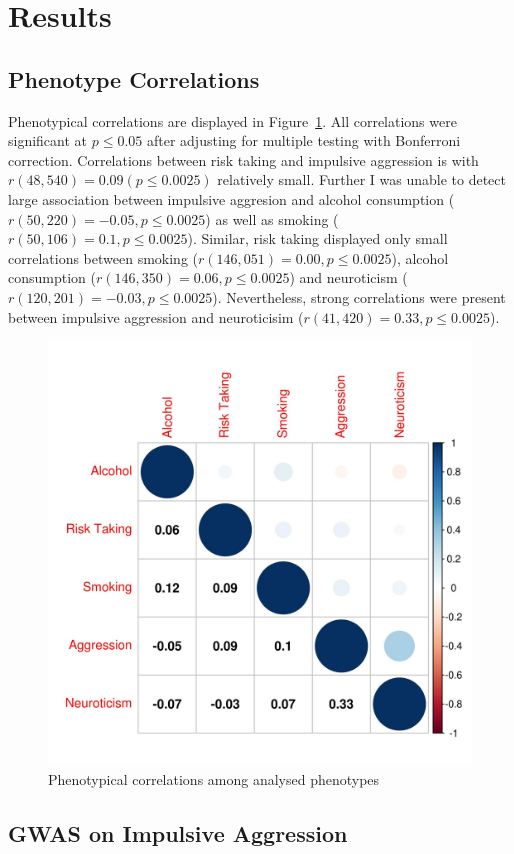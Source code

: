 \section{Results}
\label{sec:results_ukb_assoc}

\subsection{Phenotype Correlations}
\label{sub:phenotype_correlations}

Phenotypical correlations are displayed in Figure~\ref{fig:corr_pheno}. 
All correlations were significant at $p\leq 0.05$ after adjusting for multiple testing with Bonferroni correction.
Correlations between risk taking and impulsive aggression is with $r(48,540)=0.09 (p\leq0.0025)$ relatively small.
Further I was unable to detect large association between impulsive aggresion and
alcohol consumption ($r(50,220)=-0.05, p\leq0.0025$)
as well as smoking ($r(50,106)=0.1, p\leq0.0025$).
Similar, risk taking displayed only small correlations between
smoking ($r(146,051)=0.00, p\leq0.0025$),
alcohol consumption ($r(146,350)=0.06, p\leq0.0025$)
and neuroticism ($r(120,201)=-0.03, p\leq0.0025$). 
Nevertheless, strong correlations were present between impulsive aggression and neuroticisim ($r(41,420)=0.33, p\leq0.0025$).

\begin{figure}[htpb]
  \centering
  \includegraphics[width=0.6\linewidth]{ukb_assoc/figure/phenotype/corr_plot_circle_full.jpeg}
  \caption{Phenotypical correlations among analysed phenotypes}\label{fig:corr_pheno}
\end{figure}

\subsection{GWAS on Impulsive Aggression}
\label{sub:impulsive_aggression_gwas}

